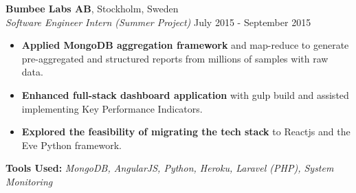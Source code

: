 \begin{minipage}[t]{0.61\textwidth}
\vspace{1em}

\noindent
\textbf{\Large Bumbee Labs AB}, \hfill Stockholm, Sweden\\
\textit{Software Engineer Intern (Summer Project)} \hfill July 2015 - September 2015
\begin{itemize}
\setlength{\itemsep}{0.5em}
    \item \textbf{Applied MongoDB aggregation framework} and map-reduce to generate pre-aggregated and structured reports from millions of samples with raw data.
    \item \textbf{Enhanced full-stack dashboard application} with gulp build and assisted implementing Key Performance Indicators.
    \item \textbf{Explored the feasibility of migrating the tech stack} to Reactjs and the Eve Python framework.
\end{itemize}
\vspace{0.2em}
\textbf{ Tools Used:} \textit{MongoDB, AngularJS, Python, Heroku, Laravel (PHP), System Monitoring}


\end{minipage}
